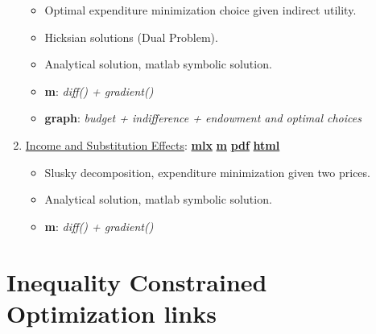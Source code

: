 \documentclass[
]{book}
\providecommand{\tightlist}{%
  \setlength{\itemsep}{0pt}\setlength{\parskip}{0pt}}
\begin{document}
\begin{enumerate}
  \begin{itemize}
  \tightlist
  \item
    Optimal expenditure minimization choice given indirect utility.
  \item
    Hicksian solutions (Dual Problem).
  \item
    Analytical solution, matlab symbolic solution.
  \item
    \textbf{m}: \emph{diff() + gradient()}
  \item
    \textbf{graph}: \emph{budget + indifference + endowment and optimal choices}
  \end{itemize}
\item
  \href{https://Math4Econ.github.io/opti_hh_constrained_brsv/htmlpdfm/household_c1_c2_constrained_r_change.html}{Income and Substitution Effects}: \href{https://github.com/Math4Econ/Math4Econ.github.io/blob/main/opti_hh_constrained_brsv/household_c1_c2_constrained_r_change.mlx}{\textbf{mlx}} \textbar{} \href{https://github.com/Math4Econ/Math4Econ.github.io/blob/main/opti_hh_constrained_brsv/htmlpdfm/household_c1_c2_constrained_r_change.m}{\textbf{m}} \textbar{} \href{https://github.com/Math4Econ/Math4Econ.github.io/blob/main/opti_hh_constrained_brsv/htmlpdfm/household_c1_c2_constrained_r_change.pdf}{\textbf{pdf}} \textbar{} \href{https://Math4Econ.github.io/opti_hh_constrained_brsv/htmlpdfm/household_c1_c2_constrained_r_change.html}{\textbf{html}}

  \begin{itemize}
  \tightlist
  \item
    Slusky decomposition, expenditure minimization given two prices.
  \item
    Analytical solution, matlab symbolic solution.
  \item
    \textbf{m}: \emph{diff() + gradient()}
  \end{itemize}
\end{enumerate}

\hypertarget{inequality-constrained-optimization-links}{%
\section{Inequality Constrained Optimization links}\label{inequality-constrained-optimization-links}}
\end{document}

